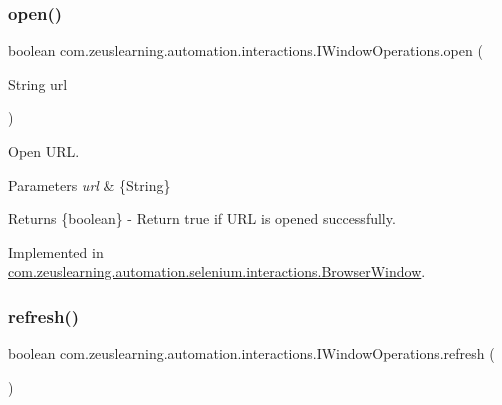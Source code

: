 \hypertarget{interfacecom_1_1zeuslearning_1_1automation_1_1interactions_1_1IWindowOperations_a51671fb00e9eaafb2e49978a8bf3305d}{}\label{interfacecom_1_1zeuslearning_1_1automation_1_1interactions_1_1IWindowOperations_a51671fb00e9eaafb2e49978a8bf3305d} 
\subsubsection{\texorpdfstring{open()}{open()}}
{\footnotesize\ttfamily boolean com.\+zeuslearning.\+automation.\+interactions.\+I\+Window\+Operations.\+open (\begin{DoxyParamCaption}\item[{String}]{url }\end{DoxyParamCaption})}

Open U\+RL.


\begin{DoxyParams}{Parameters}
{\em url} & \{String\} \\
\hline
\end{DoxyParams}
\begin{DoxyReturn}{Returns}
\{boolean\} -\/ Return {\ttfamily true} if U\+RL is opened successfully. 
\end{DoxyReturn}


Implemented in \hyperlink{classcom_1_1zeuslearning_1_1automation_1_1selenium_1_1interactions_1_1BrowserWindow_a0944339f910fc20bbb074e393270c9cc}{com.\+zeuslearning.\+automation.\+selenium.\+interactions.\+Browser\+Window}.

\hypertarget{interfacecom_1_1zeuslearning_1_1automation_1_1interactions_1_1IWindowOperations_afdd3ee64ae88246ef6f4006dcf6b094e}{}\label{interfacecom_1_1zeuslearning_1_1automation_1_1interactions_1_1IWindowOperations_afdd3ee64ae88246ef6f4006dcf6b094e} 
\subsubsection{\texorpdfstring{refresh()}{refresh()}}
{\footnotesize\ttfamily boolean com.\+zeuslearning.\+automation.\+interactions.\+I\+Window\+Operations.\+refresh (\begin{DoxyParamCaption}{ }\end{DoxyParamCaption})}

